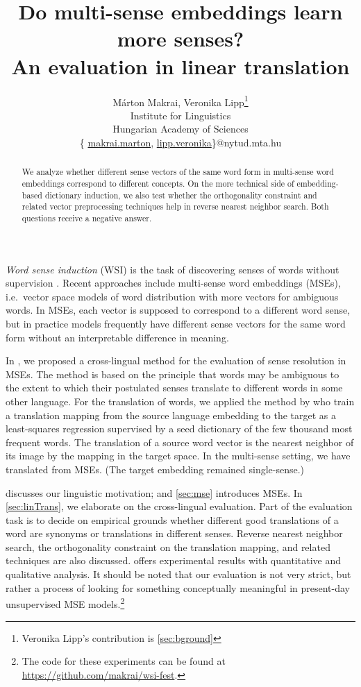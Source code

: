 \documentclass[11pt]{article}
\title{Do multi-sense embeddings learn more senses? \\ An evaluation in linear
translation}
\author{
  Márton Makrai, Veronika Lipp\thanks{\hspace{2pt} Veronika Lipp's contribution is
  \cref{sec:bground}}
  \\ Institute for Linguistics\\
  Hungarian Academy of Sciences \\
  \{ 
  \href{mailto:makrai.hlt@gmail.com}{makrai.marton}, 
  \href{mailto:lipp.veronika@nytud.mta.hu}{lipp.veronika}\}@nytud.mta.hu \\
}
\date{}
\begin{document}
\maketitle


\begin{abstract}
  We analyze whether different sense vectors of the same word form in
  multi-sense word embeddings correspond to different concepts. On the more
  technical side of embedding-based dictionary induction, we also test whether
  the orthogonality constraint and related vector preprocessing techniques help
  in reverse nearest neighbor search. Both questions receive a negative answer.
\end{abstract}

\emph{Word sense induction} (WSI) is the task of discovering senses of words
without supervision \citep{Schutze:1998}. Recent approaches include multi-sense
word embeddings (MSEs), i.e.~vector space models of word distribution with more
vectors for ambiguous words. In MSEs, each vector is supposed to correspond
to a different word sense, but in practice models frequently have different
sense vectors for the same word form without an interpretable difference in
meaning.

In \cite{Borbely:2016}, we proposed a cross-lingual method for the evaluation
of sense resolution in MSEs. The method is based on the principle that
words may be ambiguous to the extent to which their postulated senses translate to different
words in some other language.  For the translation of words, we applied the
method by \citet{Mikolov:2013x} who train a translation mapping from the source
language embedding to the target as a least-squares regression supervised by a
seed dictionary of the few thousand most frequent words. The translation of a
source word vector is the nearest neighbor of its image by the mapping in the
target space. In the multi-sense setting, we have translated from MSEs. (The
target embedding remained single-sense.)

 discusses our linguistic motivation; and \cref{sec:mse}
introduces MSEs.  In \cref{sec:linTrans}, we elaborate on the cross-lingual
evaluation. Part of the evaluation task is to decide on empirical grounds
whether different good translations of a word are synonyms or translations in
different senses.  Reverse nearest neighbor search, the orthogonality constraint
on the translation mapping, and related techniques are also discussed.
 offers experimental results with quantitative and qualitative
analysis.  It should be noted that our evaluation is not very strict,
but rather a process of looking for something conceptually meaningful in
present-day unsupervised MSE models.\footnote{The code for these experiments
can be found at \url{https://github.com/makrai/wsi-fest}.}
\end{document}
